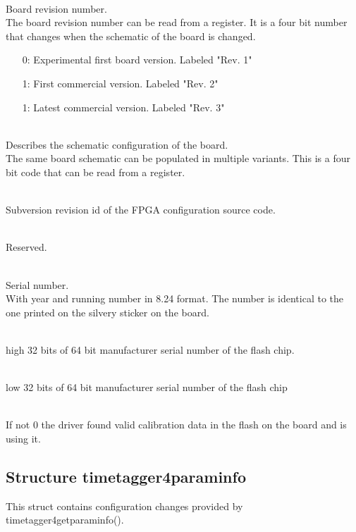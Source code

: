 			\\
			Board revision number.\\
			The board revision number can be read from a register. It is a four bit number that changes when the schematic of the board is changed.
			\begin{itemize}
				\item[0:] Experimental first board version. Labeled "Rev. 1"
				\item[1:] First commercial version. Labeled "Rev. 2"
				\item[1:] Latest commercial version. Labeled "Rev. 3"
			\end{itemize}

			\\
			Describes the schematic configuration of the board.\\
			The same board schematic can be populated in multiple variants. This is a four bit code that can be read from a register.

			\\
			Subversion revision id of the FPGA configuration source code.

			\\
			Reserved.\par

			\\
			Serial number.\\
			With year and running number in 8.24 format. The number is identical to the one printed on the silvery sticker on the board.\par

			\\
			high 32 bits of 64 bit manufacturer serial number of the flash chip.

			\\
			low 32 bits of 64 bit manufacturer serial number of the flash chip

			\\
			If not 0 the driver found valid calibration data in the flash on the board and is using it.\par

		\subsection{Structure timetagger4\tu param\tu info}
			This struct contains configuration changes provided by timetagger4\tu get\tu param\tu info().

